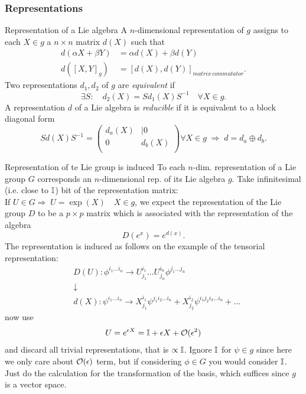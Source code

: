 \subsubsection{Representations}
\begin{mybox}{Representation of a Lie algebra}
	A $n$-dimensional representation of $g$ assigns to each $X\in g$ a $n\times n$ matrix $d(X)$ such that
	\begin{align}
		d(\alpha X+\beta Y) &= \alpha d(X) + \beta d(Y) \\
		d([X,Y]_g) &= [d(X),d(Y)]_{matrix\,commutator}.
	\end{align}
Two representations $d_1,d_2$ of $g$ are \emph{equivalent} if
\begin{equation}
\exists S:\quad d_2(X) = Sd_1(X) S^{-1} \quad \forall X\in g.
\end{equation}
A representation $d$ of a Lie algebra is \emph{reducible} if it is equivalent to a block diagonal form
\begin{equation}
	S d(X) S^{-1} = \begin{pmatrix}
	d_a(X) &| 0 \\
	0 & d_b(X)\\ 
	\end{pmatrix}
	\forall X\in g \; \Rightarrow \; d=d_a \oplus d_b.
\end{equation}
\end{mybox}
\begin{mybox}{Representation of te Lie group is induced}
	To each $n$-dim. representation of a Lie group $G$ corresponds an $n$-dimensional rep. of its Lie algebra $g$. Take infinitesimal (i.e. close to $\mathbb{I}$) bit of the representation matrix:\\
	If $U\in G\Rightarrow\; U = \exp(X) \quad X\in g$, we expect the representation of the Lie group $D$ to be a $p\times p$ matrix which is associated with the representation of the algebra
	\begin{equation}
		D(e^x) = e^{d(x)}.
	\end{equation}
 The representation is induced as follows on the example of the tensorial representation:
 \begin{align*}
 	&D(U):\phi^{i_1 \dots i_n} \rightarrow U^{i_1}_{j_1} \dots U^{i_n}_{j_n} \phi^{j_1 \dots j_n} \\
 	&\downarrow\\
 	& d(X): \psi^{i_1 \dots i_n} \rightarrow X^{i_1}_{j_1} \psi^{j_1 i_2 \dots i_n} + X^{i_2}_{j_2} \psi^{i_1 j_2 i_3 \dots i_n} + \dots
 \end{align*}
now use 
\begin{equation}
	U=e^{\epsilon X} = \mathbb{I} + \epsilon X + \mathcal{O}(\epsilon^2)
\end{equation}
and discard all trivial representations, that is $\propto \mathbb{I}$. Ignore $\mathbb{I}$ for $\psi \in g$ since here we only care about $\mathcal{O}(\epsilon)$ term, but if considering $\phi \in G$ you would consider $\mathbb{I}$. Just do the calculation for the transformation of the basis, which suffices since $g$ is a vector space.
\end{mybox}
